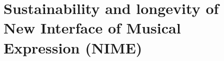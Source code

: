 \chapter{\label{ax:d-sustainability_and_longevity_of_nimes}Sustainability and longevity of New Interface of Musical Expression (NIME)}
